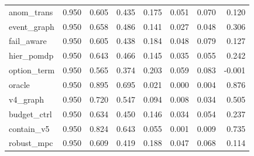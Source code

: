 \documentclass{article}
\begin{document}
\begin{longtable}{@{}lrrrrrrr@{}}
anom\_trans & 0.950 & 0.605 & 0.435 & 0.175 & 0.051 & 0.070 & 0.120 \\
event\_graph & 0.950 & 0.658 & 0.486 & 0.141 & 0.027 & 0.048 & 0.306 \\
fail\_aware & 0.950 & 0.605 & 0.438 & 0.184 & 0.048 & 0.079 & 0.127 \\
hier\_pomdp & 0.950 & 0.643 & 0.466 & 0.145 & 0.035 & 0.055 & 0.242 \\
option\_term & 0.950 & 0.565 & 0.374 & 0.203 & 0.059 & 0.083 & -0.001 \\
oracle & 0.950 & 0.895 & 0.695 & 0.021 & 0.000 & 0.004 & 0.876 \\
v4\_graph & 0.950 & 0.720 & 0.547 & 0.094 & 0.008 & 0.034 & 0.505 \\
budget\_ctrl & 0.950 & 0.634 & 0.450 & 0.146 & 0.034 & 0.054 & 0.237 \\
contain\_v5 & 0.950 & 0.824 & 0.643 & 0.055 & 0.001 & 0.009 & 0.735 \\
robust\_mpc & 0.950 & 0.609 & 0.419 & 0.188 & 0.047 & 0.068 & 0.114 \\
\bottomrule
\end{longtable}
\end{document}
